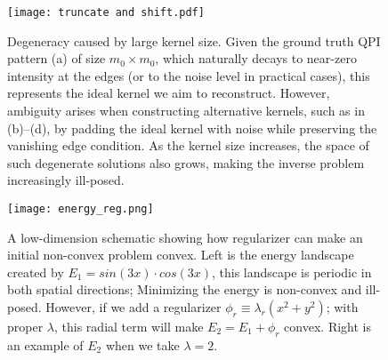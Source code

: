 \begin{figure}
	\texttt{[image: truncate and shift.pdf]} 
	\centering
	\caption{Degeneracy caused by large kernel size. Given the ground truth QPI pattern (a) of size $m_0 \times m_0$, which naturally decays to near-zero intensity at the edges (or to the noise level in practical cases), this represents the ideal kernel we aim to reconstruct. However, ambiguity arises when constructing alternative kernels, such as in (b)–(d), by padding the ideal kernel with noise while preserving the vanishing edge condition. As the kernel size increases, the space of such degenerate solutions also grows, making the inverse problem increasingly ill-posed.}
	\label{fig:ch6_t&s}
\end{figure}

\begin{figure}
	\texttt{[image: energy\_reg.png]} 
	\centering
	\caption{A low-dimension schematic showing how regularizer can make an initial non-convex problem convex. Left is the energy landscape created by $E_1 = sin(3x)\cdot cos(3x)$, this landscape is periodic in both spatial directions; Minimizing the energy is non-convex and ill-posed. However, if we add a regularizer $\phi_r \equiv \lambda_r(x^2 + y^2)$; with proper $\lambda$, this radial term will make $E_2 = E_1 + \phi_r$ convex. Right is an example of $E_2$ when we take $\lambda=2$.}
	\label{fig:ch6_reg}
\end{figure}

